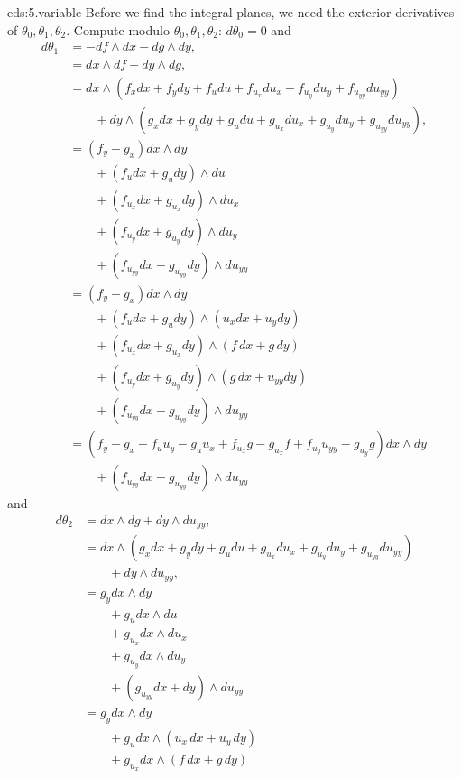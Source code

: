 \begin{answer}{eds:5.variable}
Before we find the integral planes, we need the exterior derivatives of \(\theta_0,\theta_1,\theta_2\).
Compute modulo \(\theta_0,\theta_1,\theta_2\): \(d\theta_0=0\) and
\begin{align*}
d\theta_1&=
-df\wedge dx-dg\wedge dy,\\
&=
dx\wedge df+dy\wedge dg,
\\
&=
dx\wedge
(%
f_x dx
+f_ydy
+f_udu
+f_{u_x}du_x
+f_{u_y}du_y
+f_{u_{yy}}du_{yy}
)
\\
&\qquad+
dy\wedge
(%
g_x dx
+g_ydy
+g_udu
+g_{u_x}du_x
+g_{u_y}du_y
+g_{u_{yy}}du_{yy}
),
\\
&=
(f_y-g_x)dx\wedge dy
\\
&\qquad+
(f_u dx+g_u dy)\wedge du
\\
&\qquad+
(f_{u_x} dx+g_{u_x}dy)\wedge du_x
\\
&\qquad+
(f_{u_y} dx+g_{u_y}dy)\wedge du_y
\\
&\qquad+
(f_{u_{yy}} dx+g_{u_{yy}}dy)\wedge du_{yy}
\\
&=
(f_y-g_x)dx\wedge dy
\\
&\qquad+
(f_u dx+g_u dy)\wedge (u_xdx+u_ydy)
\\
&\qquad+
(f_{u_x} dx+g_{u_x}dy)\wedge (f\,dx+g\,dy)
\\
&\qquad+
(f_{u_y} dx+g_{u_y}dy)\wedge (g\,dx+u_{yy}dy)
\\
&\qquad+
(f_{u_{yy}} dx+g_{u_{yy}}dy)\wedge du_{yy}
\\
&=
(f_y-g_x+f_u u_y-g_u u_x
+f_{u_x}g-g_{u_x}f
+f_{u_y}u_{yy}-g_{u_y}g
)dx\wedge dy
\\
&\qquad+
(f_{u_{yy}} dx+g_{u_{yy}}dy)\wedge du_{yy}
\end{align*}
and
\begin{align*}
d\theta_2
&=
dx\wedge dg+dy\wedge du_{yy},
\\
&=
dx\wedge(g_x dx+g_ydy+g_udu+g_{u_x}du_x+g_{u_y}du_y+g_{u_{yy}}du_{yy})
\\
&\qquad
+dy\wedge du_{yy},
\\
&=
g_y dx\wedge dy
\\
&\qquad
+g_u dx\wedge du
\\
&\qquad
+g_{u_x}dx\wedge du_x
\\
&\qquad
+g_{u_y} dx\wedge du_y
\\
&\qquad
+(g_{u_{yy}} dx+dy)\wedge du_{yy}
\\
&=
g_y dx\wedge dy
\\
&\qquad
+g_u dx\wedge (u_x\,dx+u_y\,dy)
\\
&\qquad
+g_{u_x}dx\wedge (f\,dx+g\,dy)

\end{align*}
\end{answer}

